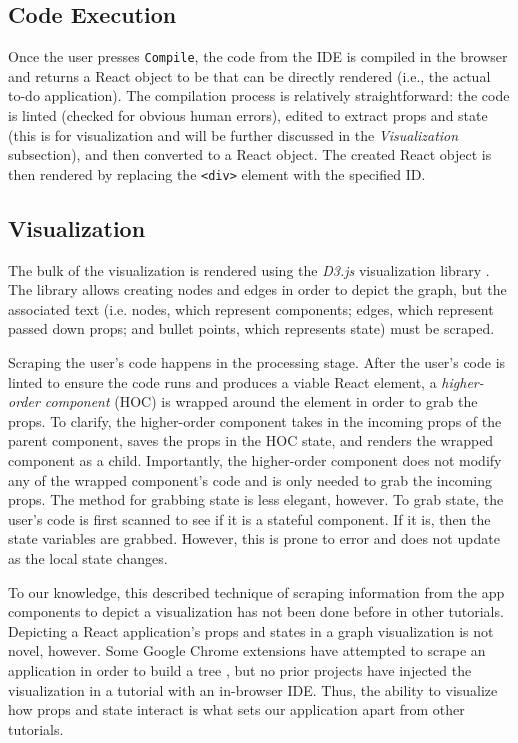 \documentclass[11pt]{article}
\begin{document}
\subsection*{Code Execution}

Once the user presses \texttt{Compile}, the code from the IDE is compiled in the browser and returns a React object to be that can be directly rendered (i.e., the actual to-do application). The compilation process is relatively straightforward: the code is linted (checked for obvious human errors), edited to extract props and state (this is for visualization and will be further discussed in the \textit{Visualization} subsection), and then converted to a React object. The created React object is then rendered by replacing the \texttt{\textless div\textgreater} element with the specified ID.

\subsection*{Visualization}

The bulk of the visualization is rendered using the \textit{D3.js} visualization library \cite{d3}. The library allows creating nodes and edges in order to depict the graph, but the associated text (i.e. nodes, which represent components; edges, which represent passed down props; and bullet points, which represents state) must be scraped.

Scraping the user's code happens in the processing stage. After the user's code is linted to ensure the code runs and produces a viable React element, a \textit{higher-order component} (HOC) is wrapped around the element in order to grab the props. To clarify, the higher-order component takes in the incoming props of the parent component, saves the props in the HOC state, and renders the wrapped component as a child. Importantly, the higher-order component does not modify any of the wrapped component's code and is only needed to grab the incoming props. The method for grabbing state is less elegant, however. To grab state, the user's code is first scanned to see if it is a stateful component. If it is, then the state variables are grabbed. However, this is prone to error and does not update as the local state changes.

To our knowledge, this described technique of scraping information from the app components to depict a visualization has not been done before in other tutorials. Depicting a React application's props and states in a graph visualization is not novel, however. Some Google Chrome extensions have attempted to scrape an application in order to build a tree \cite{reactsight} \cite{reactide}, but no prior projects have injected the visualization in a tutorial with an in-browser IDE. Thus, the ability to visualize how props and state interact is what sets our application apart from other tutorials.
\end{document}
